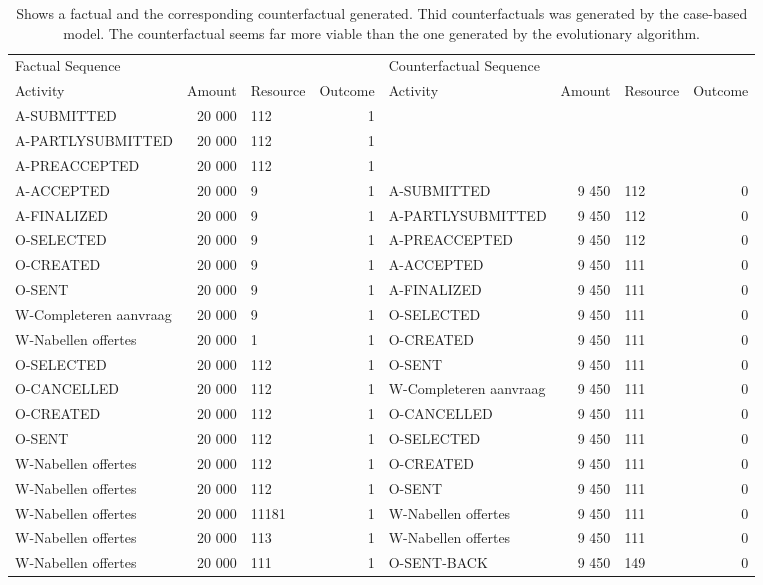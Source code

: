 \begin{table}
\caption{Shows a factual and the corresponding counterfactual generated. Thid counterfactuals was generated by the case-based model. The counterfactual seems far more viable than the one generated by the evolutionary algorithm.}
\label{tbl:example-cf-cbg}
\begin{tabular}{lrlrlrlr}
\toprule
\multicolumn{4}{l}{Factual Sequence} & \multicolumn{4}{l}{Counterfactual Sequence} \\
Activity & Amount & Resource & Outcome & Activity & Amount & Resource & Outcome \\
\midrule
A-SUBMITTED & 20 000 & 112 & 1 &  &  &  &  \\
A-PARTLYSUBMITTED & 20 000 & 112 & 1 &  &  &  &  \\
A-PREACCEPTED & 20 000 & 112 & 1 &  &  &  &  \\
A-ACCEPTED & 20 000 & 9 & 1 & A-SUBMITTED & 9 450 & 112 & 0 \\
A-FINALIZED & 20 000 & 9 & 1 & A-PARTLYSUBMITTED & 9 450 & 112 & 0 \\
O-SELECTED & 20 000 & 9 & 1 & A-PREACCEPTED & 9 450 & 112 & 0 \\
O-CREATED & 20 000 & 9 & 1 & A-ACCEPTED & 9 450 & 111 & 0 \\
O-SENT & 20 000 & 9 & 1 & A-FINALIZED & 9 450 & 111 & 0 \\
W-Completeren aanvraag & 20 000 & 9 & 1 & O-SELECTED & 9 450 & 111 & 0 \\
W-Nabellen offertes & 20 000 & 1 & 1 & O-CREATED & 9 450 & 111 & 0 \\
O-SELECTED & 20 000 & 112 & 1 & O-SENT & 9 450 & 111 & 0 \\
O-CANCELLED & 20 000 & 112 & 1 & W-Completeren aanvraag & 9 450 & 111 & 0 \\
O-CREATED & 20 000 & 112 & 1 & O-CANCELLED & 9 450 & 111 & 0 \\
O-SENT & 20 000 & 112 & 1 & O-SELECTED & 9 450 & 111 & 0 \\
W-Nabellen offertes & 20 000 & 112 & 1 & O-CREATED & 9 450 & 111 & 0 \\
W-Nabellen offertes & 20 000 & 112 & 1 & O-SENT & 9 450 & 111 & 0 \\
W-Nabellen offertes & 20 000 & 11181 & 1 & W-Nabellen offertes & 9 450 & 111 & 0 \\
W-Nabellen offertes & 20 000 & 113 & 1 & W-Nabellen offertes & 9 450 & 111 & 0 \\
W-Nabellen offertes & 20 000 & 111 & 1 & O-SENT-BACK & 9 450 & 149 & 0 \\

\end{tabular}
\end{table}
